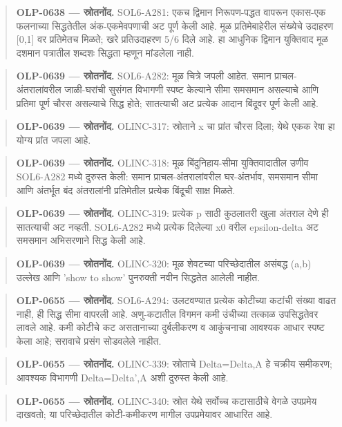 \begin{quote}\small\textbf{OLP-0638 — स्रोतनोंद.} SOL6-A281: एकच द्विमान निरूपण-पद्धत वापरून एकास-एक फलनाच्या सिद्धतेतील अंक-एकमेवपणाची अट पूर्ण केली आहे. मूळ प्रतिमेबाहेरील संख्येचे उदाहरण [0,1] वर प्रतिमेतच मिळते; खरे प्रतिउदाहरण 5/6 दिले आहे. हा आधुनिक द्विमान युक्तिवाद मूळ दशमान पत्रातील शब्दशः सिद्धता म्हणून मांडलेला नाही.\end{quote}
\begin{quote}\small\textbf{OLP-0639 — स्रोतनोंद.} SOL6-A282: मूळ चित्रे जपली आहेत. समान प्राचल-अंतरालांवरील जाळी-घरांची सुसंगत विभागणी स्पष्ट केल्याने सीमा समसमान असल्याचे आणि प्रतिमा पूर्ण चौरस असल्याचे सिद्ध होते; सातत्याची अट प्रत्येक आदान बिंदूवर पूर्ण केली आहे.\end{quote}
\begin{quote}\small\textbf{OLP-0639 — स्रोतनोंद.} OLINC-317: स्रोताने x चा प्रांत चौरस दिला; येथे एकक रेषा हा योग्य प्रांत जपला आहे.\end{quote}
\begin{quote}\small\textbf{OLP-0639 — स्रोतनोंद.} OLINC-318: मूळ बिंदुनिहाय-सीमा युक्तिवादातील उणीव SOL6-A282 मध्ये दुरुस्त केली: समान प्राचल-अंतरालांवरील घर-अंतर्भाव, समसमान सीमा आणि अंतर्भूत बंद अंतरालांनी प्रतिमेतील प्रत्येक बिंदूची साक्ष मिळते.\end{quote}
\begin{quote}\small\textbf{OLP-0639 — स्रोतनोंद.} OLINC-319: प्रत्येक p साठी कुठलातरी खुला अंतराल देणे ही सातत्याची अट नव्हती. SOL6-A282 मध्ये प्रत्येक दिलेल्या x0 वरील epsilon-delta अट समसमान अभिसरणाने सिद्ध केली आहे.\end{quote}
\begin{quote}\small\textbf{OLP-0639 — स्रोतनोंद.} OLINC-320: मूळ शेवटच्या परिच्छेदातील असंबद्ध (a,b) उल्लेख आणि 'show to show' पुनरुक्ती नवीन सिद्धतेत आलेली नाहीत.\end{quote}
\begin{quote}\small\textbf{OLP-0655 — स्रोतनोंद.} SOL6-A294: उलटवण्यात प्रत्येक कोटीच्या कटांची संख्या वाढत नाही, ही सिद्ध सीमा वापरली आहे. अणु-कटातील विगमन कमी उंचीच्या तत्काळ उपसिद्धतेवर लावले आहे. कमी कोटीचे कट असतानाच्या दुर्बलीकरण व आकुंचनाचा आवश्यक आधार स्पष्ट केला आहे; सरावाचे प्रसंग सोडवलेले नाहीत.\end{quote}
\begin{quote}\small\textbf{OLP-0655 — स्रोतनोंद.} OLINC-339: स्रोताचे Delta=Delta,A हे चक्रीय समीकरण; आवश्यक विभागणी Delta=Delta',A अशी दुरुस्त केली आहे.\end{quote}
\begin{quote}\small\textbf{OLP-0655 — स्रोतनोंद.} OLINC-340: स्रोत येथे सर्वोच्च कटासाठीचे वेगळे उपप्रमेय दाखवतो; या परिच्छेदातील कोटी-कमीकरण मागील उपप्रमेयावर आधारित आहे.\end{quote}
